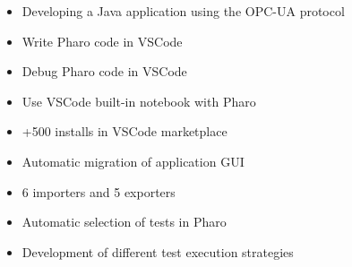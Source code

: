 \documentclass[10pt,a4paper,ragged2e,withhyper]{altacv}
\begin{document}
\begin{paracol}{2}
\divider


\begin{itemize}
  \item Developing a Java application using the OPC-UA protocol
\end{itemize}




\begin{itemize}
  \item Write Pharo code in VSCode
  \item Debug Pharo code in VSCode
  \item Use VSCode built-in notebook with Pharo
  \item +500 installs in VSCode marketplace
\end{itemize}

\divider



\begin{itemize}
  \item Automatic migration of application GUI
  \item 6 importers and 5 exporters
\end{itemize}

\divider

\begin{itemize}
  \item Automatic selection of tests in Pharo
  \item Development of different test execution strategies
\end{itemize}





\end{paracol}
\end{document}
